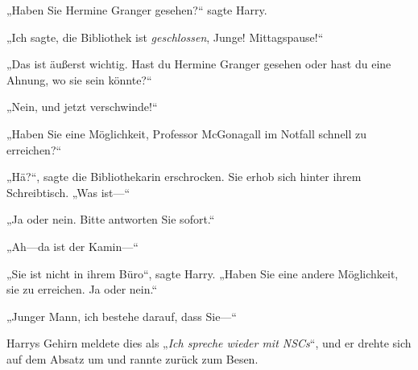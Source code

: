„Haben Sie Hermine Granger gesehen?“ sagte Harry.

„Ich sagte, die Bibliothek ist \emph{geschlossen}, Junge! Mittagspause!“

„Das ist äußerst wichtig. Hast du Hermine Granger gesehen oder hast du eine Ahnung, wo sie sein könnte?“

„Nein, und jetzt verschwinde!“

„Haben Sie eine Möglichkeit, Professor McGonagall im Notfall schnell zu erreichen?“

„Hä?“, sagte die Bibliothekarin erschrocken. Sie erhob sich hinter ihrem Schreibtisch. „Was ist—“

„Ja oder nein. Bitte antworten Sie sofort.“

„Ah—da ist der Kamin—“

„Sie ist nicht in ihrem Büro“, sagte Harry. „Haben Sie eine andere Möglichkeit, sie zu erreichen. Ja oder nein.“

„Junger Mann, ich bestehe darauf, dass Sie—“

Harrys Gehirn meldete dies als „\emph{Ich spreche wieder mit NSCs}“, und er drehte sich auf dem Absatz um und rannte zurück zum Besen.

